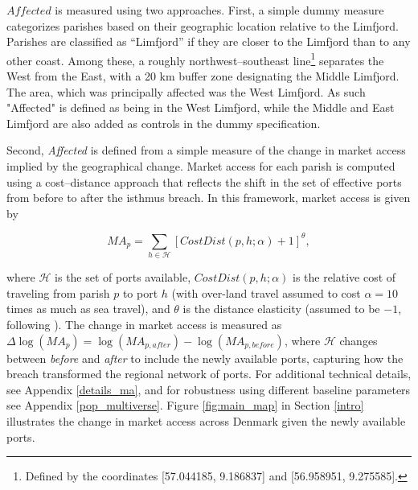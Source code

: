 \documentclass[12pt]{article}
\begin{document}
$\textit{Affected}$ is measured using two approaches. First, a simple dummy measure categorizes parishes based on their geographic location relative to the Limfjord. Parishes are classified as “Limfjord” if they are closer to the Limfjord than to any other coast. Among these, a roughly northwest–southeast line\footnote{Defined by the coordinates [57.044185, 9.186837] and [56.958951, 9.275585].} separates the West from the East, with a 20 km buffer zone designating the Middle Limfjord. The area, which was principally affected was the West Limfjord. As such "Affected" is defined as being in the West Limfjord, while the Middle and East Limfjord are also added as controls in the dummy specification. 

Second, \textit{Affected} is defined from a simple measure of the change in market access implied by the geographical change. Market access for each parish is computed using a cost–distance approach that reflects the shift in the set of effective ports from before to after the isthmus breach. In this framework, market access is given by

\begin{equation}
\label{eq:ma_eq}
\textit{MA}_p = \sum_{h \in \mathscr{H}} \left[CostDist(p, h; \alpha) + 1\right]^\theta,
\end{equation}

\noindent
where $\mathscr{H}$ is the set of ports available, $CostDist(p, h; \alpha)$ is the relative cost of traveling from parish $p$ to port $h$ (with over-land travel assumed to cost $\alpha = 10$ times as much as sea travel), and $\theta$ is the distance elasticity (assumed to be $-1$, following \cite{Harris1954, rauch2022a}). The change in market access is measured as $\Delta \log(\textit{MA}_p) = \log(\textit{MA}_{p,\textit{after}}) - \log(\textit{MA}_{p,\textit{before}})$, where $\mathscr H$ changes between \textit{before} and \textit{after} to include the newly available ports, capturing how the breach transformed the regional network of ports. For additional technical details, see Appendix \ref{details_ma}, and for robustness using different baseline parameters see Appendix \ref{pop_multiverse}. Figure \ref{fig:main_map} in Section \ref{intro} illustrates the change in market access across Denmark given the newly available ports.
\end{document}
